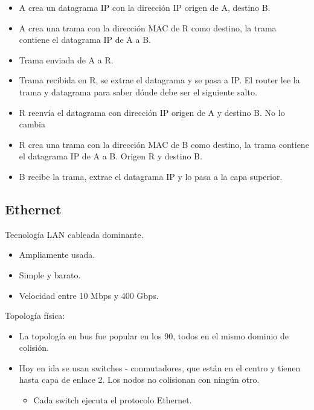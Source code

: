\documentclass[12pt, twoside, openright]{report} %
\begin{document}
\begin{itemize}
\begin{itemize}
\begin{itemize}
			            \item A crea un datagrama IP con la dirección IP origen de A, destino B.
			            \item A crea una trama con la dirección MAC de R como destino, la trama contiene el datagrama IP de A a B.
			            \item Trama enviada de A a R.
			            \item Trama recibida en R, se extrae el datagrama y se pasa a IP. El router lee la trama y datagrama para saber dónde debe ser el siguiente salto.
			            \item R reenvía el datagrama con dirección IP origen de A y destino B. No lo cambia
			            \item R crea una trama con la dirección MAC de B como destino, la trama contiene el datagrama IP de A a B. Origen R y destino B.
			            \item B recibe la trama, extrae el datagrama IP y lo pasa a la capa superior.
		            \end{itemize}
	      \end{itemize}
\end{itemize}




\subsection{Ethernet}

Tecnología LAN cableada dominante.

\begin{itemize}
	\item Ampliamente usada.
	\item Simple y barato.
	\item Velocidad entre 10 Mbps y 400 Gbps.
\end{itemize}

Topología física:

\begin{itemize}
	\item La topología en bus fue popular en los 90, todos en el mismo
	      dominio de colisión.
	\item Hoy en ida se usan switches - conmutadores, que están en el
	      centro y tienen hasta capa de enlace 2. Los nodos no colisionan
	      con ningún otro.

	      \begin{itemize}
		      \item Cada switch ejecuta el protocolo Ethernet.
	      \end{itemize}
\end{itemize}
\end{document}
